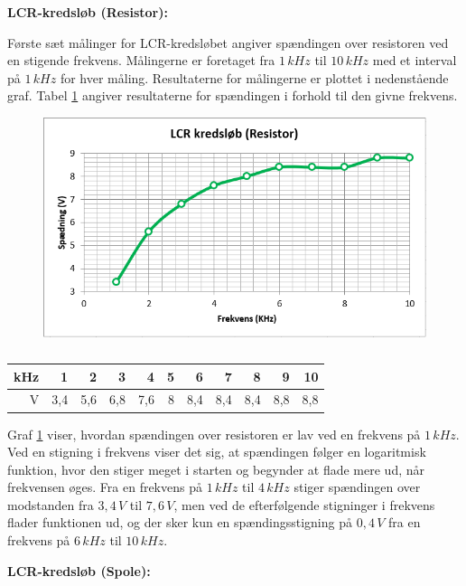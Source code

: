 \textbf{LCR-kredsløb (Resistor):}

Første sæt målinger for LCR-kredsløbet angiver spændingen over resistoren ved en stigende frekvens. Målingerne er foretaget fra $1\, kHz$ til $10\, kHz$ med et interval på $1\, kHz$ for hver måling. Resultaterne for målingerne er plottet i nedenstående graf. Tabel \ref{tabular:lcrmodstand} angiver resultaterne for spændingen i forhold til den givne frekvens.

\begin{figure}[H]
\includegraphics[scale=1]{Setup/Graf7}
\caption{}
\label{graph:lcrmodstand}
\end{figure}

\begin{table}[H]
\centering
\begin{tabular}{|r|r|r|r|r|r|r|r|r|r|r|} \hline
kHz & 1 & 2 & 3 & 4 & 5 & 6 & 7 & 8 & 9 & 10 \\ \hline
V & 3,4 & 5,6 & 6,8 & 7,6 & 8 & 8,4 & 8,4 & 8,4 & 8,8 & 8,8 \\ \hline
\end{tabular}
\caption{}
\label{tabular:lcrmodstand}
\end{table}

Graf \ref{graph:lcrmodstand} viser, hvordan spændingen over resistoren er lav ved en frekvens på $1\, kHz$. Ved en stigning i frekvens viser det sig, at spændingen følger en logaritmisk funktion, hvor den stiger meget i starten og begynder at flade mere ud, når frekvensen øges. Fra en frekvens på $1\, kHz$ til $4\, kHz$ stiger spændingen over modstanden fra $3,4\, V$ til $7,6\, V$, men ved de efterfølgende stigninger i frekvens flader funktionen ud, og der sker kun en spændingsstigning på $0,4\, V$ fra en frekvens på $6\, kHz$ til $10\, kHz$.

\textbf{LCR-kredsløb (Spole):}

